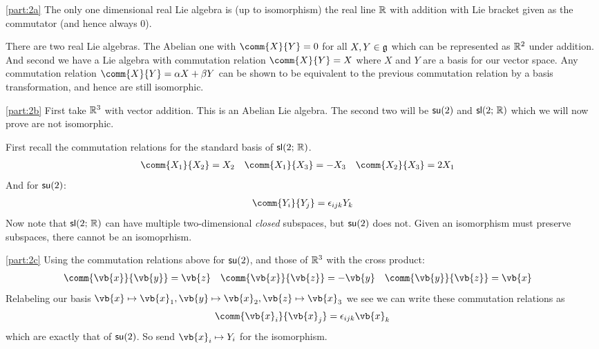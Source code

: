 \documentclass[
	pages,
	boxes,
	color=WildStrawberry
]{homework}
\begin{document}
\begin{solution}
	\ref{part:2a}
	The only one dimensional real Lie algebra is (up to isomorphism) the real line $\mathbb{R}$ with addition with Lie bracket given as the commutator (and hence always 0).

	There are two real Lie algebras. The Abelian one with $\comm{X}{Y} = 0$ for all $X, Y\in\mathfrak{g}$ which can be represented as $\mathbb{R}^2$ under addition. And second we have a Lie algebra with commutation relation $\comm{X}{Y} = X$ where $X$ and $Y$ are a basis for our vector space. Any commutation relation $\comm{X}{Y} = \alpha X + \beta Y$ can be shown to be equivalent to the previous commutation relation by a basis transformation, and hence are still isomorphic.

	\ref{part:2b}
	First take $\mathbb{R}^3$ with vector addition. This is an Abelian Lie algebra. The second two will be $\mathsf{su}(2)$ and $\mathsf{sl}(2;\, \mathbb{R})$ which we will now prove are not isomorphic.

	First recall the commutation relations for the standard basis of $\mathsf{sl}(2;\, \mathbb{R})$.
	\begin{align*}
		\comm{X_1}{X_2} & = X_2 & \comm{X_1}{X_3} & = -X_3 & \comm{X_2}{X_3} & = 2X_1
	\end{align*}
	And for $\mathsf{su}(2)$:
	\begin{align*}
		\comm{Y_i}{Y_j} = \epsilon_{ijk}Y_k
	\end{align*}
	Now note that $\mathsf{sl}(2;\, \mathbb{R})$ can have multiple two-dimensional \emph{closed} subspaces, but $\mathsf{su}(2)$ does not. Given an isomorphism must preserve subspaces, there cannot be an isomoprhism.

	\ref{part:2c}
	Using the commutation relations above for $\mathsf{su}(2)$, and those of $\mathbb{R}^3$ with the cross product:
	\begin{align*}
		\comm{\vb{x}}{\vb{y}} & = \vb{z} & \comm{\vb{x}}{\vb{z}} & = -\vb{y} & \comm{\vb{y}}{\vb{z}} & = \vb{x}
	\end{align*}
	Relabeling our basis $\vb{x}\mapsto\vb{x}_1, \vb{y}\mapsto\vb{x}_2, \vb{z}\mapsto\vb{x}_3$ we see we can write these commutation relations as
	\begin{equation*}
		\comm{\vb{x}_i}{\vb{x}_j} = \epsilon_{ijk}\vb{x}_k
	\end{equation*}
	which are exactly that of $\mathsf{su}(2)$. So send $\vb{x}_i\mapsto Y_i$ for the isomorphism.
\end{solution}
\end{document}
